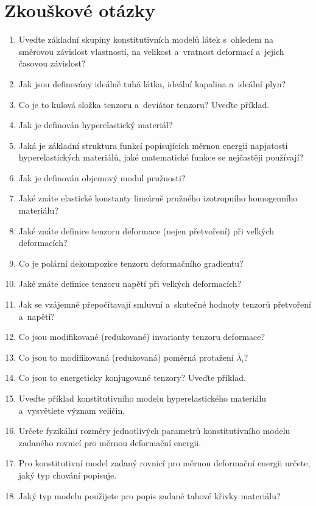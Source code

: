 \chapter{Zkouškové otázky}

\begin{enumerate}
	\item Uveďte základní skupiny konstitutivních modelů látek s~ohledem na směrovou závislost vlastností, na velikost a~vratnost deformací a~jejich časovou závislost?
	\item Jak jsou definovány ideálně tuhá látka, ideální kapalina a~ideální plyn?
	\item Co je to kulová složka tenzoru a~deviátor tenzoru? Uveďte příklad.
	\item Jak je definován hyperelastický materiál?
	\item Jaká je základní struktura funkcí popisujících měrnou energii napjatosti hyperelastických materiálů, jaké matematické funkce se nejčastěji používají?
	\item Jak je definován objemový modul pružnosti?
	\item Jaké znáte elastické konstanty lineárně pružného izotropního homogenního materiálu?
	\item Jaké znáte definice tenzoru deformace (nejen přetvoření) při velkých deformacích?
	\item Co je polární dekompozice tenzoru deformačního gradientu?
	\item Jaké znáte definice tenzoru napětí při velkých deformacích?
	\item Jak se vzájemně přepočítavají smluvní a~skutečné hodnoty tenzorů přetvoření a~napětí?
	\item Co jsou modifikované (redukované) invarianty tenzoru deformace?
	\item Co jsou to modifikovaná (redukovaná) poměrná protažení $\bar{\lambda}_i$?
	\item Co jsou to energeticky konjugované tenzory? Uveďte příklad.
	\item Uveďte příklad konstitutivního modelu hyperelastického materiálu a~vysvětlete význam veličin.
	\item Určete fyzikální rozměry jednotlivých parametrů konstitutivního modelu zadaného rovnicí pro měrnou deformační energii.
	\item Pro konstitutivní model zadaný rovnicí pro měrnou deformační energii určete, jaký typ chování popisuje.
	\item Jaký typ modelu použijete pro popis zadané tahové křivky materiálu?

\end{enumerate}
